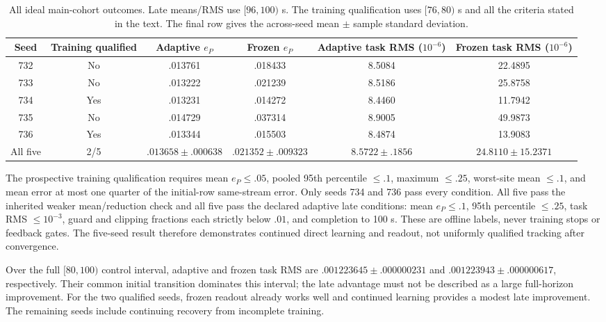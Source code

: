 \begin{table}[t]
\centering
\caption{All ideal main-cohort outcomes. Late means/RMS use $[96,100)$ s.
The training qualification uses $[76,80)$ s and all the criteria stated in the text.
The final row gives the across-seed mean $\pm$ sample standard deviation.}
\label{tab:direct_burgers_ideal}
\renewcommand{\arraystretch}{1.15}
\begin{tabular}{c c c c c c}
\hline
Seed & Training qualified & Adaptive $e_P$ & Frozen $e_P$ &
Adaptive task RMS ($10^{-6}$) & Frozen task RMS ($10^{-6}$)\\
\hline
732 & No & .013761 & .018433 & 8.5084 & 22.4895\\
733 & No & .013222 & .021239 & 8.5186 & 25.8758\\
734 & Yes & .013231 & .014272 & 8.4460 & 11.7942\\
735 & No & .014729 & .037314 & 8.9005 & 49.9873\\
736 & Yes & .013344 & .015503 & 8.4874 & 13.9083\\
\hline
All five & 2/5 & $.013658\pm.000638$ & $.021352\pm.009323$ &
$8.5722\pm.1856$ & $24.8110\pm15.2371$\\
\hline
\end{tabular}
\end{table}

The prospective training qualification requires mean $e_P\leq.05$, pooled
95th percentile $\leq.1$, maximum $\leq.25$, worst-site mean $\leq.1$, and
mean error at most one quarter of the initial-row same-stream error. Only
seeds 734 and 736 pass every condition. All five pass the inherited weaker
mean/reduction check and all five pass the declared adaptive late conditions:
mean $e_P\leq.1$, 95th percentile $\leq.25$, task RMS $\leq10^{-3}$,
guard and clipping fractions each strictly below $.01$, and completion to
100 s. These are offline labels, never training stops or feedback gates.
The five-seed result therefore demonstrates continued direct learning and
readout, not uniformly qualified tracking after convergence.

Over the full $[80,100)$ control interval, adaptive and frozen task RMS are
$.001223645\pm.000000231$ and $.001223943\pm.000000617$, respectively.
Their common initial transition dominates this interval; the late advantage
must not be described as a large full-horizon improvement. For the two
qualified seeds, frozen readout already works well and continued learning
provides a modest late improvement. The remaining seeds include continuing
recovery from incomplete training.

